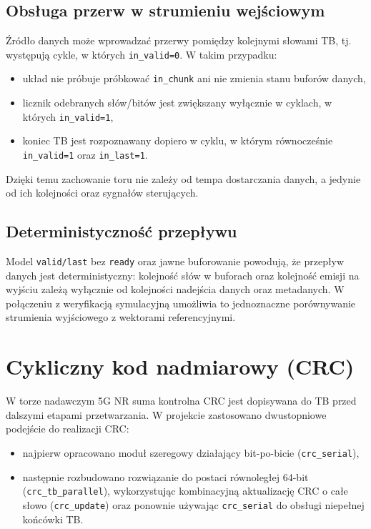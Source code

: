 \subsection{Obsługa przerw w strumieniu wejściowym}
Źródło danych może wprowadzać przerwy pomiędzy kolejnymi słowami TB, tj. występują cykle, w których \texttt{in\_valid=0}. W takim przypadku:
\begin{itemize}
    \item układ nie próbuje próbkować \texttt{in\_chunk} ani nie zmienia stanu buforów danych,
    \item licznik odebranych słów/bitów jest zwiększany wyłącznie w cyklach, w których \texttt{in\_valid=1},
    \item koniec TB jest rozpoznawany dopiero w cyklu, w którym równocześnie \texttt{in\_valid=1} oraz \texttt{in\_last=1}.
\end{itemize}

Dzięki temu zachowanie toru nie zależy od tempa dostarczania danych, a jedynie od ich kolejności oraz sygnałów sterujących.

\subsection{Deterministyczność przepływu}
Model \texttt{valid/last} bez \texttt{ready} oraz jawne buforowanie powodują, że przepływ danych jest deterministyczny: kolejność słów w buforach oraz kolejność emisji na wyjściu zależą wyłącznie od kolejności nadejścia danych oraz metadanych. W połączeniu z weryfikacją symulacyjną umożliwia to jednoznaczne porównywanie strumienia wyjściowego z wektorami referencyjnymi.


\section{Cykliczny kod nadmiarowy (CRC)}
\label{sec:CRC}

W torze nadawczym 5G NR suma kontrolna CRC jest dopisywana do TB przed dalszymi etapami przetwarzania. W projekcie zastosowano dwustopniowe podejście do realizacji CRC:
\begin{itemize}
    \item najpierw opracowano moduł szeregowy działający bit-po-bicie (\texttt{crc\_serial}),
    \item następnie rozbudowano rozwiązanie do postaci równoległej 64-bit (\texttt{crc\_tb\_parallel}), wykorzystując kombinacyjną aktualizację CRC o całe słowo (\texttt{crc\_update}) oraz ponownie używając \texttt{crc\_serial} do obsługi niepełnej końcówki TB.
\end{itemize}

